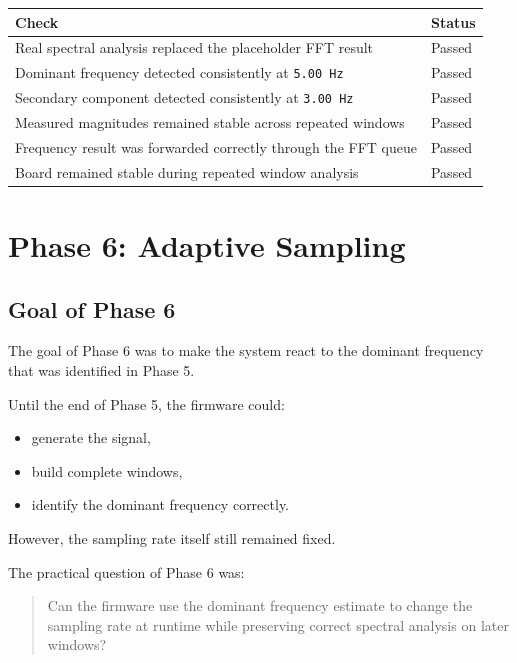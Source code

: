 \documentclass[12pt,a4paper]{article}
\begin{document}
\begin{longtable}{|>{\raggedright\arraybackslash}p{}|>{\raggedright\arraybackslash}p{}|}
\hline
\textbf{Check} & \textbf{Status} \\
\hline
Real spectral analysis replaced the placeholder FFT result & Passed \\
\hline
Dominant frequency detected consistently at \texttt{5.00 Hz} & Passed \\
\hline
Secondary component detected consistently at \texttt{3.00 Hz} & Passed \\
\hline
Measured magnitudes remained stable across repeated windows & Passed \\
\hline
Frequency result was forwarded correctly through the FFT queue & Passed \\
\hline
Board remained stable during repeated window analysis & Passed \\
\hline
\end{longtable}

\section{Phase 6: Adaptive Sampling}

\subsection{Goal of Phase 6}

The goal of Phase 6 was to make the system react to the dominant frequency that
was identified in Phase 5.

Until the end of Phase 5, the firmware could:

\begin{itemize}
    \item generate the signal,
    \item build complete windows,
    \item identify the dominant frequency correctly.
\end{itemize}

However, the sampling rate itself still remained fixed.

The practical question of Phase 6 was:

\begin{quote}
Can the firmware use the dominant frequency estimate to change the sampling
rate at runtime while preserving correct spectral analysis on later windows?
\end{quote}
\end{document}
